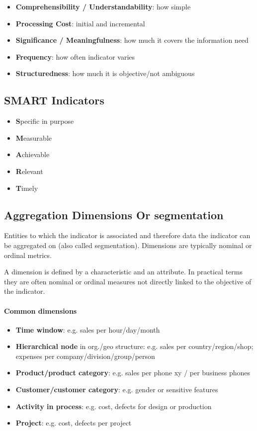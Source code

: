 \begin{itemize}
  \item \textbf{Comprehensibility / Understandability}: how simple
  \item \textbf{Processing Cost}: initial and incremental
  \item \textbf{Significance / Meaningfulness}: how much it covers the information need
  \item \textbf{Frequency}: how often indicator varies
  \item \textbf{Structuredness}: how much it is objective/not ambiguous
\end{itemize}

\subsection{SMART Indicators}

\begin{itemize}
  \item \textbf{S}pecific in purpose
  \item \textbf{M}easurable
  \item \textbf{A}chievable
  \item \textbf{R}elevant
  \item \textbf{T}imely
\end{itemize}

\subsection{Aggregation Dimensions Or segmentation}

Entities to which the indicator is associated and therefore data the indicator can be
aggregated on (also called segmentation). Dimensions are typically nominal or ordinal metrics.

A dimension is defined by a characteristic and an attribute. In practical terms they are
often nominal or ordinal measures not directly linked to the objective of the indicator.

\paragraph{Common dimensions}
\begin{itemize}
  \item \textbf{Time window}: e.g. sales per hour/day/month
  \item \textbf{Hierarchical node} in org./geo structure:
        e.g. sales per country/region/shop; expenses per company/division/group/person
  \item \textbf{Product/product category}: e.g. sales per phone xy / per business phones
  \item \textbf{Customer/customer category}: e.g. gender or sensitive features
  \item \textbf{Activity in process}: e.g. cost, defects for design or production
  \item \textbf{Project}: e.g. cost, defects per project
\end{itemize}

